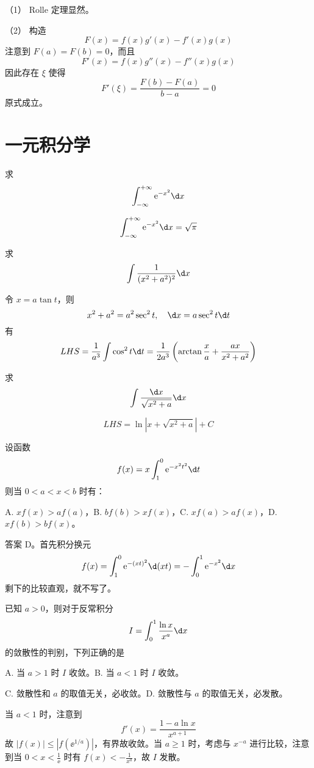 \begin{solution}
	（1） Rolle 定理显然。

	（2） 构造
	\[ F(x) = f(x) g'(x) - f'(x) g(x) \]
	注意到 $F(a) = F(b) = 0$，而且
	\[ F'(x) = f(x) g''(x) - f''(x) g(x) \]
	因此存在 $\xi$ 使得
	\[ F'(\xi) = \frac{F(b) - F(a)}{b - a} = 0 \]
	原式成立。
\end{solution}

\section{一元积分学}

\begin{problem}[000008]
求
\[ \int_{-\infty}^{+\infty} \ee^{-x^2}\d x \]
\end{problem}
\begin{solution}
	\[ \int_{-\infty}^{+\infty} \ee^{-x^2}\d x = \sqrt{\pi} \]
\end{solution}

\begin{problem}[000014]
求
\[ \int \frac{1}{(x^2+a^2)^2} \d x \]
\end{problem}
\begin{solution}
	令 $x = a \tan t$，则
	\[ x^2 + a^2 = a^2 \sec^2 t, \quad \d x = a \sec^2 t \d t \]
	有
	\[ LHS =  \frac{1}{a^3}\int \cos^2 t \d t = \frac{1}{2a^3} \left( \arctan \frac{x}{a} + \frac{ax}{x^2+a^2} \right) \]
\end{solution}


\begin{problem}[000015]
求
\[ \int \frac{\d x}{\sqrt{x^2 + a}} \d x \]
\end{problem}
\begin{solution}
	\[ LHS =  \ln |x + \sqrt{x^2+a}| + C \]
\end{solution}


\begin{problem}[000022]
设函数
\[ f(x) = x \int_{1}^{0} \ee^{-x^2t^2} \d t \]
则当 $0<a<x<b$ 时有：

A. $xf(x) > af(a)$，B. $bf(b) > x f(x)$，C. $xf(a) > af(x)$，D. $xf(b) > bf(x)$。
\end{problem}

\begin{solution}
	答案 D。首先积分换元
	\[ f(x) = \int_{1}^{0} \ee^{-(xt)^2} \d (xt) = -\int_{0}^{1} \ee^{-x^2} \d x  \]
	剩下的比较直观，就不写了。
\end{solution}


\begin{problem}[000027]
已知 $a > 0$，则对于反常积分
\[ I = \int_{0}^{1} \frac{\ln x}{x^a} \d x \]
的敛散性的判别，下列正确的是

A. 当 $a > 1$ 时 $I$ 收敛。B. 当 $a < 1$ 时 $I$ 收敛。

C. 敛散性和 $a$ 的取值无关，必收敛。D. 敛散性与 $a$ 的取值无关，必发散。
\end{problem}
\begin{solution}
	当 $a < 1$ 时，注意到
	\[ f'(x) = \frac{1 - a \ln x}{x^{a+1}} \]
	故 $|f(x)| \leqslant |f(\ee^{1/a})|$，有界故收敛。当 $a \geqslant 1$ 时，考虑与 $x^{-a}$ 进行比较，注意到当 $0 < x < \frac{1}{\ee}$ 时有 $f(x) < -\frac{1}{x^a}$，故 $I$ 发散。
\end{solution}

